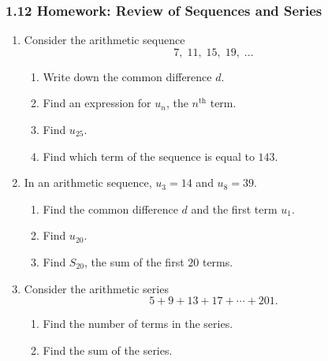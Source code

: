 \documentclass[12pt, twoside]{article}
\begin{document}
\subsubsection*{1.12 Homework: Review of Sequences and Series}

\begin{enumerate}[itemsep=0.15cm]

\item[1.]
Consider the arithmetic sequence
$$7,\; 11,\; 15,\; 19,\; \ldots$$

\begin{enumerate}[itemsep=0.1cm]
  \item Write down the common difference $d$. \vfill
  \item Find an expression for $u_{n}$, the $n^{\text{th}}$ term. \vfill
  \item Find $u_{25}$. \vfill
  \item Find which term of the sequence is equal to $143$. \vfill
\end{enumerate}

\item[2.]
In an arithmetic sequence, $u_{3} = 14$ and $u_{8} = 39$.

\begin{enumerate}[itemsep=0.1cm]
  \item Find the common difference $d$ and the first term $u_{1}$. \vfill
  \item Find $u_{20}$. \vfill
  \item Find $S_{20}$, the sum of the first $20$ terms. \vfill
\end{enumerate}

\newpage

\item[3.]
Consider the arithmetic series
$$5 + 9 + 13 + 17 + \cdots + 201.$$

\begin{enumerate}[itemsep=0.1cm]
  \item Find the number of terms in the series. \vfill
  \item Find the sum of the series. \vfill
\end{enumerate}


\end{enumerate}
\end{document}
